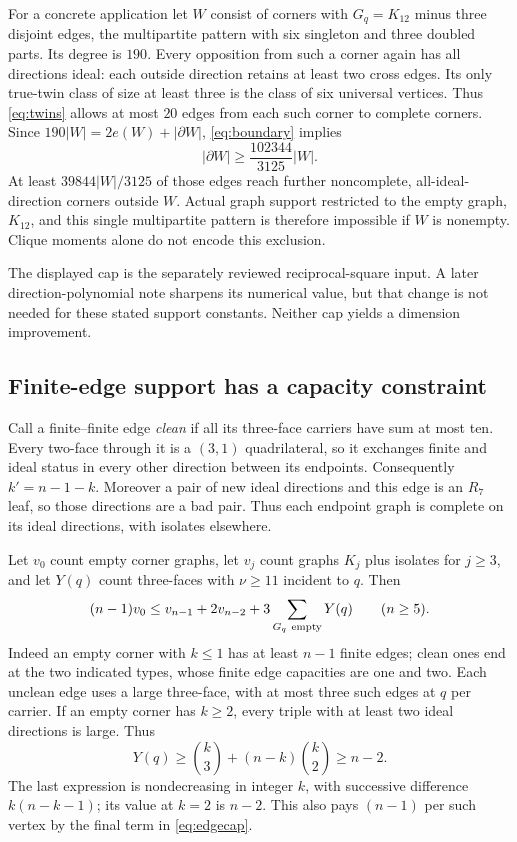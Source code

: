 \documentclass[11pt]{article}
\theoremstyle{definition}\newtheorem{definition}[theorem]{Definition}
\theoremstyle{remark}\newtheorem{remark}[theorem]{Remark}
\newcommand{\nuu}{\nu}
\newcommand{\Rseven}{R_7}
\newcommand{\bin}[2]{\binom{#1}{#2}}
\begin{document}
For a concrete application let \(W\) consist of corners with
\(G_q=K_{12}\) minus three disjoint edges, the multipartite pattern
with six singleton and three doubled parts. Its degree is \(190\).
Every opposition from such a corner again has all directions ideal:
each outside direction retains at least two cross edges. Its only
true-twin class of size at least three is the class of six universal
vertices. Thus \eqref{eq:twins} allows at most \(20\) edges from
each such corner to complete corners. Since
\(190|W|=2e(W)+|\partial W|\), \eqref{eq:boundary} implies
\[
 |\partial W|\ge\frac{102344}{3125}|W|.
\]
At least \(39844|W|/3125\) of those edges reach further
noncomplete, all-ideal-direction corners outside \(W\).
Actual graph support restricted to the empty graph, \(K_{12}\),
and this single multipartite pattern is therefore impossible if \(W\)
is nonempty. Clique moments alone do not encode this exclusion.

The displayed cap is the separately reviewed reciprocal-square input.
A later direction-polynomial note sharpens its numerical value, but
that change is not needed for these stated support constants. Neither
cap yields a dimension improvement.

\subsection{Finite-edge support has a capacity constraint}
Call a finite--finite edge \emph{clean} if all its three-face carriers
have sum at most ten. Every two-face through it is a \((3,1)\)
quadrilateral, so it exchanges finite and ideal status in every other
direction between its endpoints. Consequently \(k'=n-1-k\).
Moreover a pair of new ideal directions and this edge is an
\(\Rseven\) leaf, so those directions are a bad pair. Thus each
endpoint graph is complete on its ideal directions, with isolates
elsewhere.

Let \(v_0\) count empty corner graphs, let \(v_j\) count graphs
\(K_j\) plus isolates for \(j\ge3\), and let \(Y(q)\) count
three-faces with \(\nuu\ge11\) incident to \(q\). Then
\begin{equation}\label{eq:edgecap}
 (n-1)v_0\le v_{n-1}+2v_{n-2}
             +3\sum_{G_q\ {\rm empty}}Y(q)\qquad(n\ge5).
\end{equation}
Indeed an empty corner with \(k\le1\) has at least \(n-1\)
finite edges; clean ones end at the two indicated types, whose finite
edge capacities are one and two. Each unclean edge uses a large
three-face, with at most three such edges at \(q\) per carrier.
If an empty corner has \(k\ge2\), every triple with at least two
ideal directions is large. Thus
\[
 Y(q)\ge\bin{k}{3}+(n-k)\bin{k}{2}\ge n-2.
\]
The last expression is nondecreasing in integer \(k\), with successive
difference \(k(n-k-1)\); its value at \(k=2\) is \(n-2\).
This also pays \((n-1)\) per such vertex by the final term in
\eqref{eq:edgecap}.
\end{document}

